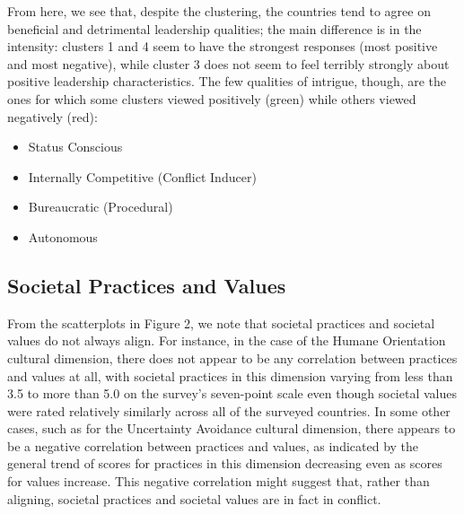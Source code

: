 \documentclass[
]{article}
\providecommand{\tightlist}{%
  \setlength{\itemsep}{0pt}\setlength{\parskip}{0pt}}
\begin{document}
From here, we see that, despite the clustering, the countries tend to
agree on beneficial and detrimental leadership qualities; the main
difference is in the intensity: clusters 1 and 4 seem to have the
strongest responses (most positive and most negative), while cluster 3
does not seem to feel terribly strongly about positive leadership
characteristics. The few qualities of intrigue, though, are the ones for
which some clusters viewed positively (green) while others viewed
negatively (red):

\begin{itemize}
\tightlist
\item
  Status Conscious
\item
  Internally Competitive (Conflict Inducer)
\item
  Bureaucratic (Procedural)
\item
  Autonomous
\end{itemize}

\hypertarget{societal-practices-and-values}{%
\subsection{Societal Practices and
Values}\label{societal-practices-and-values}}

From the scatterplots in Figure 2, we note that societal practices and
societal values do not always align. For instance, in the case of the
Humane Orientation cultural dimension, there does not appear to be any
correlation between practices and values at all, with societal practices
in this dimension varying from less than 3.5 to more than 5.0 on the
survey's seven-point scale even though societal values were rated
relatively similarly across all of the surveyed countries. In some other
cases, such as for the Uncertainty Avoidance cultural dimension, there
appears to be a negative correlation between practices and values, as
indicated by the general trend of scores for practices in this dimension
decreasing even as scores for values increase. This negative correlation
might suggest that, rather than aligning, societal practices and
societal values are in fact in conflict.
\end{document}
